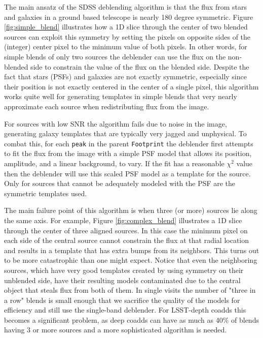 The main ansatz of the SDSS deblending algorithm is that the flux from stars and galaxies in a ground based telescope is nearly 180 degree symmetric.
Figure \ref{fig:simple_blend} illustrates how a 1D slice through the center of two blended sources can exploit this symmetry by setting the pixels on opposite sides of the (integer) center pixel to the minimum value of both pixels.
In other words, for simple blends of only two sources the deblender can use the flux on the non-blended side to constrain the value of the flux on the blended side.
Despite the fact that stars (PSFs) and galaxies are not exactly symmetric, especially since their position is not exactly centered in the center of a single pixel, this algorithm works quite well for generating templates in simple blends that very nearly approximate each source when redistributing flux from the image.

For sources with low SNR the algorithm fails due to noise in the image, generating galaxy templates that are typically very jagged and unphysical.
To combat this, for each \texttt{peak} in the parent \texttt{Footprint} the deblender first attempts to fit the flux from the image with a simple PSF model that allows its position, amplitude, and a linear background, to vary.
If the fit has a reasonable $\chi^2$ value then the deblender will use this scaled PSF model as a template for the source.
Only for sources that cannot be adequately modeled with the PSF are the symmetric templates used.

The main failure point of this algorithm is when three (or more) sources lie along the same axis.
For example, Figure \ref{fig:complex_blend} illustrates a 1D slice through the center of three aligned sources.
In this case the minimum pixel on each side of the central source cannot constrain the flux at that radial location and results in a template that has extra bumps from its neighbors.
This turns out to be more catastrophic than one might expect.
Notice that even the neighboring sources, which have very good templates created by using symmetry on their unblended side, have their resulting models contaminated due to the central object that steals flux from both of them.
In single visits the number of "three in a row" blends is small enough that we sacrifice the quality of the models for efficiency and still use the single-band deblender.
For LSST-depth coadds this becomes a significant problem, as deep coadds can have as much as 40\% of blends having 3 or more sources and a more sophisticated algorithm is needed.

